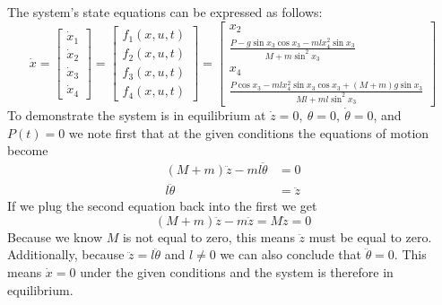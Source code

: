 \documentclass[11pt]{article}
\begin{document}
The system's state equations can be expressed as follows:
\begin{equation*}
	\dot{x} = \begin{bmatrix} \dot{x}_1 \\ \dot{x}_2 \\ \dot{x}_3 \\ \dot{x}_4 \end{bmatrix} = \begin{bmatrix} f_1(x,u,t) \\ f_2(x,u,t) \\ f_3(x,u,t) \\ f_4(x,u,t) \end{bmatrix} = \begin{bmatrix} x_2 \\ \frac{P-g\sin x_3 \cos x_3-mlx_4^2\sin x_3}{M+m\sin^2x_3} \\ x_4 \\ \frac{P\cos x_3 - mlx_4^2\sin x_3 \cos x_3 + (M+m)g\sin x_3}{Ml + ml\sin^2x_3} \end{bmatrix}
\end{equation*}
To demonstrate the system is in equilibrium at $\dot{z}=0,\ \theta=0,\ \dot{\theta}=0$, and $P(t)=0$ we note first that at the given conditions the equations of motion become 
\begin{align*}
	(M+m)\ddot{z}-ml\ddot{\theta} &= 0 \\
	l\ddot{\theta} &= \ddot{z}
\end{align*}
If we plug the second equation back into the first we get
\begin{equation*}
	(M+m)\ddot{z} - m\ddot{z}=M\ddot{z}=0
\end{equation*}
Because we know $M$ is not equal to zero, this means $\ddot{z}$ must be equal to zero. Additionally, because $\ddot{z} = l\ddot{\theta}$ and $l\neq0$ we can also conclude that $\ddot{\theta}=0$. This means $\dot{x}=0$ under the given conditions and the system is therefore in equilibrium.
\end{document}
